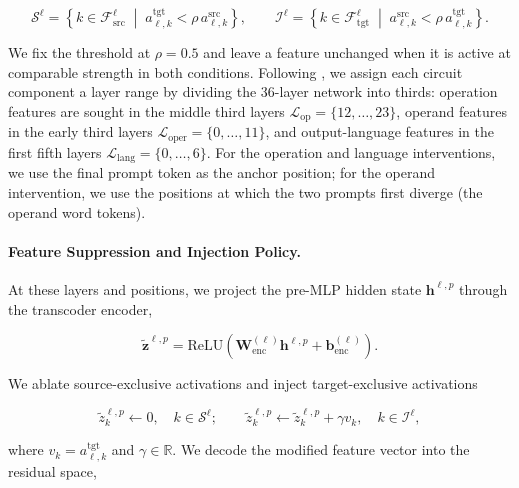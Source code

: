 \begin{equation}
  \mathcal{S}^\ell
    = \left\{k \in \mathcal{F}_{\mathrm{src}}^\ell
        \;\middle|\; a_{\ell,k}^{\mathrm{tgt}} < \rho\,a_{\ell,k}^{\mathrm{src}}\right\},
  \qquad
  \mathcal{I}^\ell
    = \left\{k \in \mathcal{F}_{\mathrm{tgt}}^\ell
        \;\middle|\; a_{\ell,k}^{\mathrm{src}} < \rho\,a_{\ell,k}^{\mathrm{tgt}}\right\}.
  \label{eq:exclusive-sets}
\end{equation}

We fix the threshold at $\rho=0.5$ and leave a feature unchanged when it is
active at comparable strength in both conditions. Following \citet{lindsey2025biology}, we assign each circuit component a layer
range by dividing the 36-layer network into thirds: operation features are sought
in the middle third layers $\mathcal{L}_{\mathrm{op}} = \{12,\ldots,23\}$, operand features in the early third layers
$\mathcal{L}_{\mathrm{oper}} = \{0,\ldots,11\}$, and output-language features in the first fifth layers $\mathcal{L}_{\mathrm{lang}} = \{0,\ldots,6\}$. For the operation
and language interventions, we use the final prompt token as the anchor position; for the operand intervention, we use
the positions at which the two prompts first diverge (the operand word tokens).

\paragraph{Feature Suppression and Injection Policy.}

At these layers and positions, we project the pre-MLP hidden state
$\mathbf{h}^{\ell,p}$ through the transcoder encoder,

\begin{equation}
  \tilde{\mathbf{z}}^{\ell,p}
    = \mathrm{ReLU}\!\left(
        \mathbf{W}_{\mathrm{enc}}^{(\ell)}\mathbf{h}^{\ell,p}
        + \mathbf{b}_{\mathrm{enc}}^{(\ell)}
      \right).
  \label{eq:reenc}
\end{equation}

We ablate source-exclusive activations and inject target-exclusive activations

\begin{equation}
  \tilde{z}^{\ell,p}_k \leftarrow 0,
  \quad k \in \mathcal{S}^\ell;
  \qquad
  \tilde{z}^{\ell,p}_k \leftarrow \tilde{z}^{\ell,p}_k + \gamma v_k,
  \quad k \in \mathcal{I}^\ell,
  \label{eq:suppress-inject}
\end{equation}

where $v_k=a_{\ell,k}^{\mathrm{tgt}}$ and $\gamma \in \mathbb{R}$.  
We decode the modified feature vector
into the residual space,

